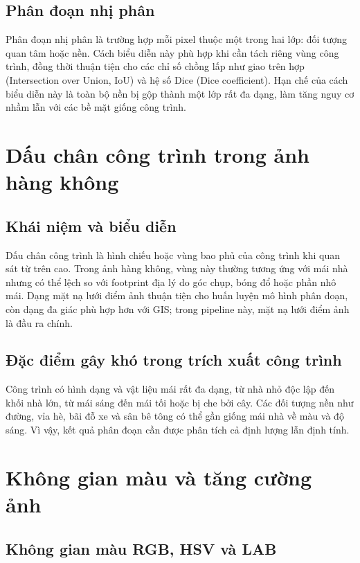 \documentclass[12pt,a4paper]{report}
\begin{document}
\subsection{Phân đoạn nhị phân}

Phân đoạn nhị phân là trường hợp mỗi pixel thuộc một trong hai lớp: đối tượng quan tâm hoặc nền. Cách biểu diễn này phù hợp khi cần tách riêng vùng công trình, đồng thời thuận tiện cho các chỉ số chồng lấp như giao trên hợp (Intersection over Union, IoU) và hệ số Dice (Dice coefficient). Hạn chế của cách biểu diễn này là toàn bộ nền bị gộp thành một lớp rất đa dạng, làm tăng nguy cơ nhầm lẫn với các bề mặt giống công trình.

\section{Dấu chân công trình trong ảnh hàng không}

\subsection{Khái niệm và biểu diễn}

Dấu chân công trình là hình chiếu hoặc vùng bao phủ của công trình khi quan sát từ trên cao. Trong ảnh hàng không, vùng này thường tương ứng với mái nhà nhưng có thể lệch so với footprint địa lý do góc chụp, bóng đổ hoặc phần nhô mái. Dạng mặt nạ lưới điểm ảnh thuận tiện cho huấn luyện mô hình phân đoạn, còn dạng đa giác phù hợp hơn với GIS; trong pipeline này, mặt nạ lưới điểm ảnh là đầu ra chính.

\subsection{Đặc điểm gây khó trong trích xuất công trình}

Công trình có hình dạng và vật liệu mái rất đa dạng, từ nhà nhỏ độc lập đến khối nhà lớn, từ mái sáng đến mái tối hoặc bị che bởi cây. Các đối tượng nền như đường, vỉa hè, bãi đỗ xe và sân bê tông có thể gần giống mái nhà về màu và độ sáng. Vì vậy, kết quả phân đoạn cần được phân tích cả định lượng lẫn định tính.

\section{Không gian màu và tăng cường ảnh}

\subsection{Không gian màu RGB, HSV và LAB}
\end{document}

